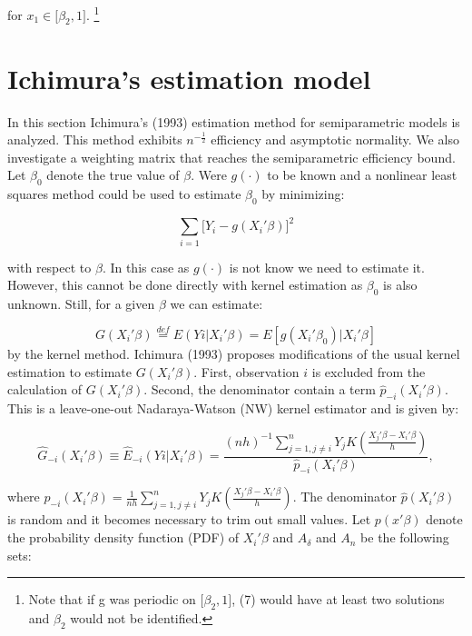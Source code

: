 \documentclass[a4paper]{article}
\begin{document}
for $x_1 \in \big[\beta_2,1\big]$. \footnote{Note that if g was periodic on $\big[\beta_2,1\big]$, (7) would have at least two solutions and $\beta_2$ would not be identified.}


\section{Ichimura's estimation model} %
\label{sec:Ichimura's estimation model}

In this section Ichimura's (1993) estimation method for semiparametric models is analyzed. This method exhibits $n^{-\frac{1}{2}}$ efficiency and asymptotic normality. We also investigate a weighting matrix that reaches the semiparametric efficiency bound. Let $\beta_0$ denote the true value of $\beta$. Were $g(\cdot)$ to be known and a nonlinear least squares method could be used to estimate $\beta_0$ by minimizing:

\begin{equation}
\sum_{i = 1}\big[Y_i - g(X_i'\beta)\big]^2
\end{equation}

with respect to $\beta$.
In this case as $g(\cdot)$ is not know we need to estimate it. However, this cannot be done directly with kernel estimation as $\beta_0$ is also unknown. Still, for a given $\beta$ we can estimate:

\begin{equation}
G(X_i'\beta) \stackrel{def}{=} E(Yi|X_i'\beta) = E[g(X_i'\beta_0)|X_i'\beta]
\end{equation}
 by the kernel method. Ichimura (1993) proposes modifications of the usual kernel estimation to estimate $G(X_i'\beta)$. First, observation $i$ is excluded from the calculation of $G(X_i'\beta)$. Second, the denominator contain a term $\hat{p}_{-i}(X_i'\beta)$. This is a leave-one-out Nadaraya-Watson (NW) kernel estimator and is given by:

\begin{equation}
\hat{G}_{-i}(X_i'\beta) \equiv \hat{E}_{-i}(Yi|X_i'\beta) = \frac{(nh)^{-1}\sum_{j=1, j \neq i }^{n}  Y_jK(\frac{X_j'\beta - X_i'\beta}{h})}{\hat{p}_{-i}(X_i'\beta)},
\end{equation}

where $\hat{p}_{-i}(X_i'\beta) = \frac{1}{nh}\sum_{j=1,j \neq i}^{n}Y_{j}K(\frac{X_j'\beta - X_i'\beta}{h})$.  The denominator $\hat{p}(X_i'\beta)$ is random and it becomes necessary to trim out small values. Let $p(x'\beta)$ denote the probability density function (PDF) of $X_i'\beta$ and $A_\delta$ and $A_n$ be the following sets:
\end{document}
